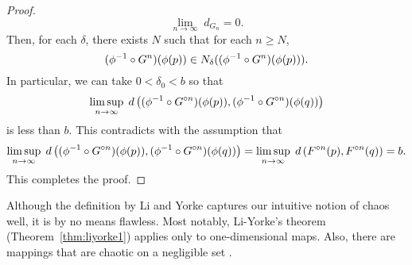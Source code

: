 \documentclass[12pt,draft,twoside]{book}
\begin{document}
\begin{theorem}
\begin{proof}
  \begin{equation*}
    \lim\limits_{n \to \infty}\; d_{G_n} = 0.
  \end{equation*}
  Then, for each $\delta$, there exists $N$ such that for each $n \geq N$,
  \begin{equation*}
    (\phi^{-1} \circ G^n)(\phi(p)) \in N_{\delta}((\phi^{-1} \circ G^n)(\phi(p))).
  \end{equation*}
  In particular, we can take $0 < \delta_0 < b$ so that
  \begin{equation*}
    \limsup\limits_{n \to \infty}\; d\left( (\phi^{-1}\circ G^{\circ n})(\phi(p)) , (\phi^{-1}\circ G^{\circ n})(\phi(q)) \right)
  \end{equation*}
  is less than $b$.
  This contradicts with the assumption that
  \begin{equation*}
    \limsup\limits_{n \to \infty}\; d\left( (\phi^{-1}\circ G^{\circ n})(\phi(p)) , (\phi^{-1}\circ G^{\circ n})(\phi(q)) \right)
    = \limsup\limits_{n \to \infty}\; d\left( F^{\circ n}(p) , F^{\circ n}(q) \right) 
    = b.
    \end{equation*}
  This completes the proof.
  \end{proof}
  \label{thm:liyorke-conj}
\end{theorem}
Although the definition by Li and Yorke captures our intuitive notion of chaos well, it is by no means flawless.
Most notably, Li-Yorke's theorem (Theorem~\ref{thm:liyorke1}) applies only to one-dimensional maps.
Also, there are mappings that are chaotic on a negligible set \citep{martelli}.
\end{document}
